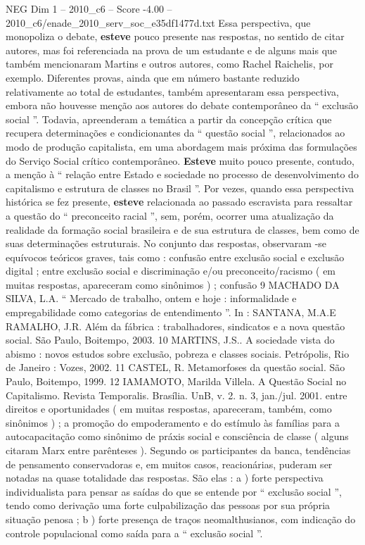\begin{textsample}{NEG Dim 1 – 2010\_c6 – Score -4.00 – 2010\_c6/enade\_2010\_serv\_soc\_e35df1477d.txt}
Essa perspectiva, que monopoliza o debate, \textbf{esteve} pouco presente nas respostas, no sentido de citar autores, mas foi referenciada na prova de um estudante e de alguns mais que também mencionaram Martins e outros autores, como Rachel Raichelis, por exemplo.
Diferentes provas, ainda que em número bastante reduzido relativamente ao total de estudantes, também apresentaram essa perspectiva, embora não houvesse menção aos autores do debate contemporâneo da “ exclusão social ”.
Todavia, apreenderam a temática a partir da concepção crítica que recupera determinações e condicionantes da “ questão social ”, relacionados ao modo de produção capitalista, em uma abordagem mais próxima das formulações do Serviço Social crítico contemporâneo. \textbf{Esteve} muito pouco presente, contudo, a menção à “ relação entre Estado e sociedade no processo de desenvolvimento do capitalismo e estrutura de classes no Brasil ”.
Por vezes, quando essa perspectiva histórica se fez presente, \textbf{esteve} relacionada ao passado escravista para ressaltar a questão do “ preconceito racial ”, sem, porém, ocorrer uma atualização da realidade da formação social brasileira e de sua estrutura de classes, bem como de suas determinações estruturais.
No conjunto das respostas, observaram -se equívocos teóricos graves, tais como : confusão entre exclusão social e exclusão digital ; entre exclusão social e discriminação e/ou preconceito/racismo ( em muitas respostas, apareceram como sinônimos ) ; confusão 9 MACHADO DA SILVA, L.A. “ Mercado de trabalho, ontem e hoje : informalidade e empregabilidade como categorias de entendimento ”.
In : SANTANA, M.A.E RAMALHO, J.R.
Além da fábrica : trabalhadores, sindicatos e a nova questão social.
São Paulo, Boitempo, 2003. 10 MARTINS, J.S..
A sociedade vista do abismo : novos estudos sobre exclusão, pobreza e classes sociais.
Petrópolis, Rio de Janeiro : Vozes, 2002. 11 CASTEL, R.
Metamorfoses da questão social.
São Paulo, Boitempo, 1999. 12 IAMAMOTO, Marilda Villela.
A Questão Social no Capitalismo.
Revista Temporalis.
Brasília.
UnB, v. 2. n. 3, jan./jul. 2001. entre direitos e oportunidades ( em muitas respostas, apareceram, também, como sinônimos ) ; a promoção do empoderamento e do estímulo às famílias para a autocapacitação como sinônimo de práxis social e consciência de classe ( alguns citaram Marx entre parênteses ).
Segundo os participantes da banca, tendências de pensamento conservadoras e, em muitos casos, reacionárias, puderam ser notadas na quase totalidade das respostas.
São elas : a ) forte perspectiva individualista para pensar as saídas do que se entende por “ exclusão social ”, tendo como derivação uma forte culpabilização das pessoas por sua própria situação penosa ; b ) forte presença de traços neomalthusianos, com indicação do controle populacional como saída para a “ exclusão social ”.

\end{textsample}
